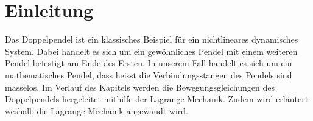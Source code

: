 
\section{Einleitung}
Das Doppelpendel ist ein klassisches Beispiel für ein nichtlineares dynamisches System. %
Dabei handelt es sich um ein gewöhnliches Pendel mit einem weiteren Pendel
befestigt am Ende des Ersten.
In unserem Fall handelt es sich um ein mathematisches Pendel, dass heisst
die Verbindungsstangen des Pendels sind masselos.
Im Verlauf des Kapitels werden die Bewegungsgleichungen des Doppelpendels
hergeleitet mithilfe der Lagrange Mechanik.
Zudem wird erläutert weshalb die Lagrange Mechanik angewandt wird.